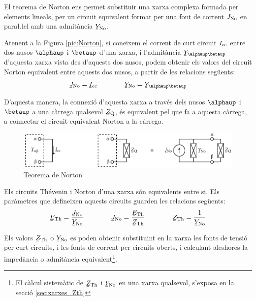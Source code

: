 El teorema de Norton ens permet substituir
una xarxa complexa formada per elements lineals, per un circuit
equivalent format per una font de corrent $\cmplx{J}\ped{No}$ en
para{\l.l}el amb una admit\`{a}ncia $\cmplx{Y}\ped{No}$.

Atenent a la Figura \vref{pic:Norton}, si coneixem el corrent de
curt circuit $\cmplx{I}\ped{cc}$ entre dos nusos $\alphaup$ i $\betaup$
d'una xarxa, i l'admit\`{a}ncia $\cmplx{Y}_{\alphaup\betaup}$ d'aquesta
xarxa vista des d'aquests dos nusos, podem obtenir els valors del
circuit Norton equivalent entre aquests dos nusos, a partir de les
relacions seg\"{u}ents:
\begin{equation}
   \cmplx{J}\ped{No} = \cmplx{I}\ped{cc} \qquad\qquad \cmplx{Y}\ped{No} = \cmplx{Y}_{\alphaup\betaup}
\end{equation}

D'aquesta manera, la connexi\'{o} d'aquesta xarxa a trav\'{e}s dels nusos
$\alphaup$ i $\betaup$ a una c\`{a}rrega qualsevol $\cmplx{Z}\ped{Q}$, \'{e}s
equivalent pel que fa a aquesta c\`{a}rrega, a connectar el circuit
equivalent Norton a la c\`{a}rrega.
\begin{figure}[h]
\centering
    \includegraphics{Imatges/Cap-Fonaments-Norton.pdf}
\caption{Teorema de Norton} \label{pic:Norton}
\end{figure}

Els circuits Th\'{e}venin i Norton d'una xarxa s\'{o}n equivalents entre si.
Els par\`{a}metres que defineixen aquests circuits guarden les relacions
seg\"{u}ents:
\begin{equation}\label{eq:Thevenin-Norton}
   \cmplx{E}\ped{Th} = \frac{\cmplx{J}\ped{No}}{\cmplx{Y}\ped{No}} \qquad\qquad
   \cmplx{J}\ped{No} = \frac{\cmplx{E}\ped{Th}}{\cmplx{Z}\ped{Th}} \qquad\qquad
    \cmplx{Z}\ped{Th} = \frac{1}{\cmplx{Y}\ped{No}}
\end{equation}

Els valors $\cmplx{Z}\ped{Th}$ o  $\cmplx{Y}\ped{No}$ es poden
obtenir substituint en la xarxa  les fonts de tensi\'{o}  per curt
circuits, i les fonts de corrent per circuits oberts, i calculant
aleshores la imped\`{a}ncia o admit\`{a}ncia equivalent\footnote{El c\`{a}lcul sistem\`{a}tic de $\cmplx{Z}\ped{Th}$ i  $\cmplx{Y}\ped{No}$ en una xarxa qualsevol, s'exposa en la secci\'{o} \ref{sec:xarxes_Zth}}.


